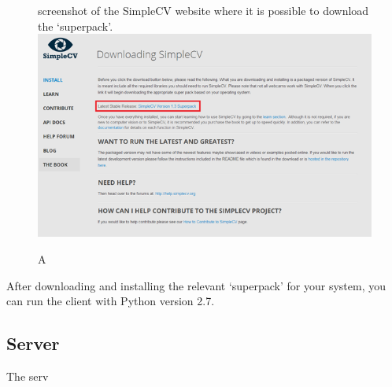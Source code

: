 \documentclass[a4paper]{article}
\begin{document}
\begin{figure}[H]
    \centering
    \caption A screenshot of the SimpleCV website where it is possible to download the `superpack'.
    \includegraphics[scale=0.7]{../shared_assets/screenshots/manual/simplecv_download.png}
\end{figure}

After downloading and installing the relevant `superpack' for your system, you can run the client with Python version 2.7.

\subsection{Server}
The serv
\end{document}
